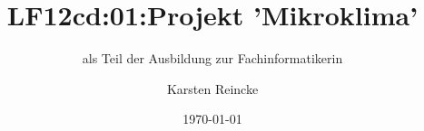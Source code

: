 \documentclass[]{beamer}
\title{LF12cd:01:Projekt 'Mikroklima'}
\subtitle{als Teil der Ausbildung zur Fachinformatikerin}
\institute{GS-LDK}
\author{Karsten Reincke}
\date{\today}
\def\cfgGl{../../../cfg.gl/}
\begin{document}

\begin{frame}
  \titlepage
\end{frame}






\logo{}
\newpage




\end{document}
